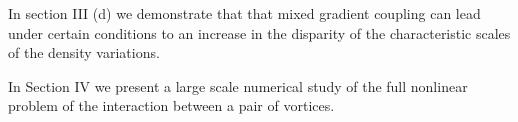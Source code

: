 In section III (d) we demonstrate that that mixed gradient coupling can lead 
under certain conditions to an increase in the disparity of the characteristic 
scales of the density variations.

In Section IV we present a large scale numerical study of the full nonlinear 
problem of the interaction between a pair of vortices.
